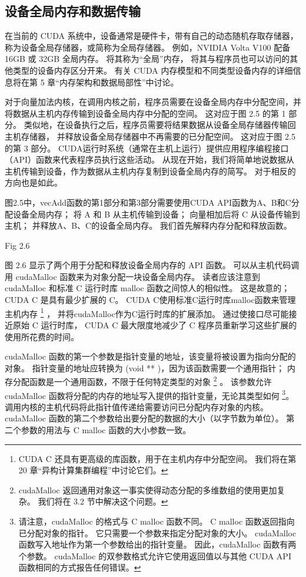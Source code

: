 \subsection{设备全局内存和数据传输}
在当前的 CUDA 系统中，设备通常是硬件卡，带有自己的动态随机存取存储器，称为设备全局存储器，或简称为全局存储器。 
例如，NVIDIA Volta V100 配备 16GB 或 32GB 全局内存。 将其称为“全局”内存，
将其与程序员也可以访问的其他类型的设备内存区分开来。 
有关 CUDA 内存模型和不同类型设备内存的详细信息将在第 5 章“内存架构和数据局部性”中讨论。

对于向量加法内核，在调用内核之前，程序员需要在设备全局内存中分配空间，并将数据从主机内存传输到设备全局内存中分配的空间。 
这对应于图 2.5 的第 1 部分。 类似地，在设备执行之后，程序员需要将结果数据从设备全局存储器传输回主机存储器，
并释放设备全局存储器中不再需要的已分配空间。 这对应于图 2.5 的第 3 部分。 
CUDA运行时系统（通常在主机上运行）提供应用程序编程接口（API）函数来代表程序员执行这些活动。 
从现在开始，我们将简单地说数据从主机传输到设备，作为数据从主机内存复制到设备全局内存的简写。 对于相反的方向也是如此。

图2.5中，vecAdd函数的第1部分和第3部分需要使用CUDA API函数为A、B和C分配设备全局内存； 
将 A 和 B 从主机传输到设备； 向量相加后将 C 从设备传输到主机； 并释放A、B、C的设备全局内存。
我们首先解释内存分配和释放函数。

{\color{red} Fig 2.6}

图 2.6 显示了两个用于分配和释放设备全局内存的 API 函数。 
可以从主机代码调用 cudaMalloc 函数来为对象分配一块设备全局内存。 
读者应该注意到 cudaMalloc 和标准 C 运行时库 malloc 函数之间惊人的相似性。 
这是故意的； CUDA C 是具有最少扩展的 C。 CUDA C使用标准C运行时库malloc函数来管理主机内存
\footnote{CUDA C 还具有更高级的库函数，用于在主机内存中分配空间。 我们将在第 20 章“异构计算集群编程”中讨论它们。} ，
并将cudaMalloc作为C运行时库的扩展添加。 通过使接口尽可能接近原始 C 运行时库，
CUDA C 最大限度地减少了 C 程序员重新学习这些扩展的使用所花费的时间。

cudaMalloc 函数的第一个参数是指针变量的地址，该变量将被设置为指向分配的对象。
指针变量的地址应转换为 (void ** )，因为该函数需要一个通用指针； 内存分配函数是一个通用函数，不限于任何特定类型的对象
\footnote{cudaMalloc 返回通用对象这一事实使得动态分配的多维数组的使用更加复杂。 我们将在 3.2 节中解决这个问题。} 。
该参数允许 cudaMalloc 函数将分配的内存的地址写入提供的指针变量，无论其类型如何
\footnote{请注意，cudaMalloc 的格式与 C malloc 函数不同。 C malloc 函数返回指向已分配对象的指针。 
它只需要一个参数来指定分配对象的大小。 cudaMalloc 函数写入地址作为第一个参数给出的指针变量。 
因此，cudaMalloc 函数有两个参数。 
cudaMalloc 的双参数格式允许它使用返回值以与其他 CUDA API 函数相同的方式报告任何错误。}。
调用内核的主机代码将此指针值传递给需要访问已分配内存对象的内核。 
cudaMalloc 函数的第二个参数给出要分配的数据的大小（以字节数为单位）。 
第二个参数的用法与 C malloc 函数的大小参数一致。

